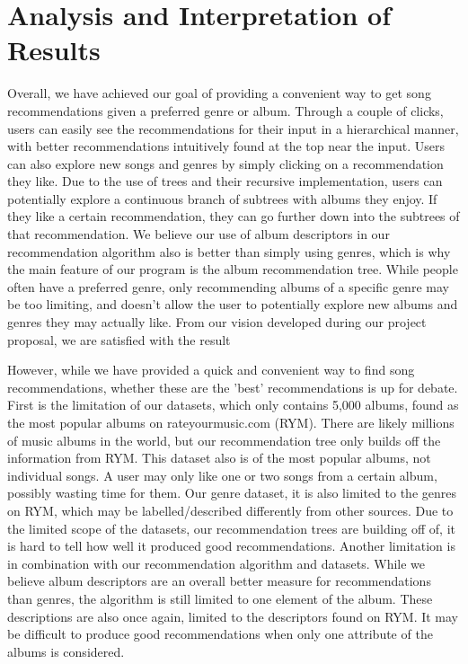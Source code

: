 \documentclass[fontsize=11pt]{article}
\begin{document}
\section*{Analysis and Interpretation of Results}

Overall, we have achieved our goal of providing a convenient way to get song recommendations given a preferred genre or album. Through a couple of clicks, users can easily see the recommendations for their input in a hierarchical manner, with better recommendations intuitively found at the top near the input. Users can also explore new songs and genres by simply clicking on a recommendation they like. Due to the use of trees and their recursive implementation, users can potentially explore a continuous branch of subtrees with albums they enjoy. If they like a certain recommendation, they can go further down into the subtrees of that recommendation. We believe our use of album descriptors in our recommendation algorithm also is better than simply using genres, which is why the main feature of our program is the album recommendation tree. While people often have a preferred genre, only recommending albums of a specific genre may be too limiting, and doesn't allow the user to potentially explore new albums and genres they may actually like. From our vision developed during our project proposal, we are satisfied with the result \newline

However, while we have provided a quick and convenient way to find song recommendations, whether these are the 'best' recommendations is up for debate. First is the limitation of our datasets, which only contains 5,000 albums, found as the most popular albums on rateyourmusic.com (RYM). There are likely millions of music albums in the world, but our recommendation tree only builds off the information from RYM. This dataset also is of the most popular albums, not individual songs. A user may only like one or two songs from a certain album, possibly wasting time for them. Our genre dataset, it is also limited to the genres on RYM, which may be labelled/described differently from other sources. Due to the limited scope of the datasets, our recommendation trees are building off of, it is hard to tell how well it produced good recommendations. Another limitation is in combination with our recommendation algorithm and datasets. While we believe album descriptors are an overall better measure for recommendations than genres, the algorithm is still limited to one element of the album. These descriptions are also once again, limited to the descriptors found on RYM. It may be difficult to produce good recommendations when only one attribute of the albums is considered. \newline
\end{document}

